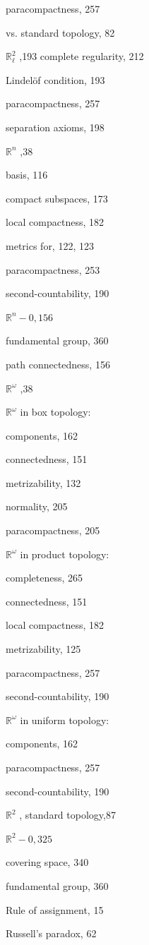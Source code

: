 paracompactness, 257

vs. standard topology, 82

\({\mathbb{R}}_{\ell }^{2}\) ,193 complete regularity, 212

Lindelöf condition, 193

paracompactness, 257

separation axioms, 198

\({\mathbb{R}}^{n}\) ,38

basis, 116

compact subspaces, 173

local compactness, 182

metrics for, 122, 123

paracompactness, 253

second-countability, 190

\({\mathbb{R}}^{n} - 0,{156}\)

fundamental group, 360

path connectedness, 156

\({\mathbb{R}}^{\omega }\) ,38

\({\mathbb{R}}^{\omega }\) in box topology:

components, 162

connectedness, 151

metrizability, 132

normality, 205

paracompactness, 205

\({\mathbb{R}}^{\omega }\) in product topology:

completeness, 265

connectedness, 151

local compactness, 182

metrizability, 125

paracompactness, 257

second-countability, 190

\({\mathbb{R}}^{\omega }\) in uniform topology:

components, 162

paracompactness, 257

second-countability, 190

\({\mathbb{R}}^{2}\) , standard topology,87

\({\mathbb{R}}^{2} - 0,{325}\)

covering space, 340

fundamental group, 360

Rule of assignment, 15

Russell's paradox, 62

